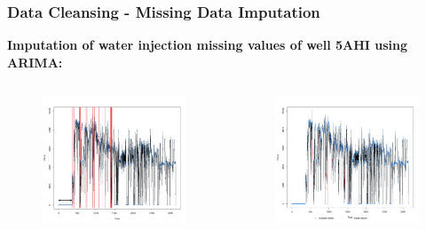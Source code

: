 \documentclass[xcolor=table]{beamer}
\begin{document}
\begin{frame}
\frametitle{Data Cleansing - Missing Data Imputation}
\textbf{Imputation of water injection missing values of well 5AHI using ARIMA:}
\begin{columns}[c]

\begin{figure}
\includegraphics[width=1\linewidth,left]{WI_missing2.png} 
\end{figure}


\begin{figure}
\includegraphics[width=1\linewidth,left]{WI_imputation2.png} 
\end{figure}

\end{columns}
\end{frame}
\end{document}
